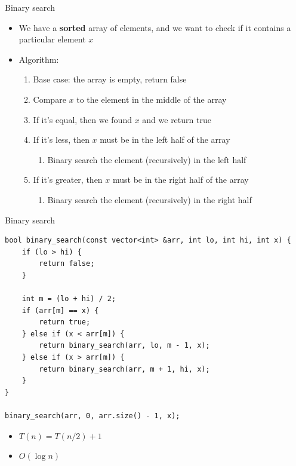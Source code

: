 \documentclass[10pt]{beamer}
\newcommand{\bi}{\begin{itemize}}
\newcommand{\ei}{\end{itemize}}
\begin{document}
\begin{frame}{Binary search}
    \bi
        \item We have a \textbf{sorted} array of elements, and we want to check if it contains a particular element $x$
        \vspace{5pt}
        \item Algorithm:
            \begin{enumerate}
                \item Base case: the array is empty, return false
                \item Compare $x$ to the element in the middle of the array
                \item If it's equal, then we found $x$ and we return true
                \item If it's less, then $x$ must be in the left half of the array
                    \begin{enumerate}
                        \item Binary search the element (recursively) in the left half
                    \end{enumerate}
                \item If it's greater, then $x$ must be in the right half of the array
                    \begin{enumerate}
                        \item Binary search the element (recursively) in the right half
                    \end{enumerate}
            \end{enumerate}
    \ei
\end{frame}

\begin{frame}[fragile]{Binary search}
    \begin{verbatim}
bool binary_search(const vector<int> &arr, int lo, int hi, int x) {
    if (lo > hi) {
        return false;
    }

    int m = (lo + hi) / 2;
    if (arr[m] == x) {
        return true;
    } else if (x < arr[m]) {
        return binary_search(arr, lo, m - 1, x);
    } else if (x > arr[m]) {
        return binary_search(arr, m + 1, hi, x);
    }
}

binary_search(arr, 0, arr.size() - 1, x);
    \end{verbatim}

    \bi
        \item $T(n) = T(n/2) + 1$
        \item $O(\log n)$
    \ei
\end{frame}
\end{document}
